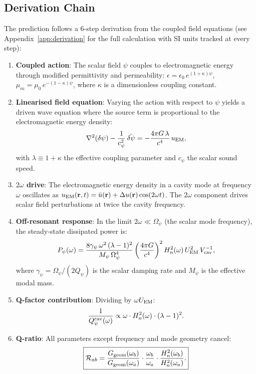 \documentclass[11pt]{article}
\newcommand{\Rq}{\mathcal{R}}
\newcommand{\Heff}{H_n}
\begin{document}
\subsection{Derivation Chain}

The prediction follows a 6-step derivation from the coupled field
equations (see Appendix~\ref{app:derivation} for the full calculation
with SI units tracked at every step):

\begin{enumerate}
\item \textbf{Coupled action}: The scalar field $\psi$ couples to
  electromagnetic energy through modified permittivity and permeability:
  $\epsilon = \epsilon_0\,e^{(1+\kappa)\psi}$,
  $\mu_m = \mu_0\,e^{-(1-\kappa)\psi}$, where $\kappa$ is a
  dimensionless coupling constant.

\item \textbf{Linearised field equation}: Varying the action with
  respect to $\psi$ yields a driven wave equation where the source
  term is proportional to the electromagnetic energy density:
  \begin{equation}
  \nabla^2(\delta\psi) - \frac{1}{c_\psi^2}\,\ddot{\delta\psi}
  = -\frac{4\pi G\,\lambda}{c^4}\,u_{\rm EM},
  \end{equation}
  with $\lambda \equiv 1 + \kappa$ the effective coupling parameter
  and $c_\psi$ the scalar sound speed.

\item \textbf{$2\omega$ drive}: The electromagnetic energy density in
  a cavity mode at frequency $\omega$ oscillates as
  $u_{\rm EM}(\mathbf{r},t) = \bar{u}(\mathbf{r}) +
  \Delta u(\mathbf{r})\cos(2\omega t)$. The $2\omega$ component
  drives scalar field perturbations at twice the cavity frequency.

\item \textbf{Off-resonant response}: In the limit $2\omega \ll
  \Omega_\psi$ (the scalar mode frequency), the steady-state
  dissipated power is:
  \begin{equation}
  P_\psi(\omega) = \frac{8\gamma_\psi\,\omega^2\,(\lambda-1)^2}
  {M_\psi\,\Omega_\psi^4}
  \left(\frac{4\pi G}{c^4}\right)^2
  \Heff^2(\omega)\,U_{\rm EM}^2\,V_{\rm cav}^{-1},
  \end{equation}
  where $\gamma_\psi = \Omega_\psi/(2Q_\psi)$ is the scalar damping
  rate and $M_\psi$ is the effective modal mass.

\item \textbf{Q-factor contribution}: Dividing by $\omega U_{\rm EM}$:
  \begin{equation}
  \frac{1}{Q_\psi^{\rm cav}(\omega)} \propto \omega \cdot
  \Heff^2(\omega) \cdot (\lambda - 1)^2.
  \end{equation}

\item \textbf{Q-ratio}: All parameters except frequency and mode
  geometry cancel:
  \begin{equation}
  \boxed{
  \Rq_{ab} = \frac{G_{\rm geom}(\omega_b)}{G_{\rm geom}(\omega_a)}
  \cdot \frac{\omega_b}{\omega_a}
  \cdot \frac{\Heff^2(\omega_b)}{\Heff^2(\omega_a)}.
  }
  \label{eq:Rq-general}
  \end{equation}
\end{enumerate}
\end{document}
